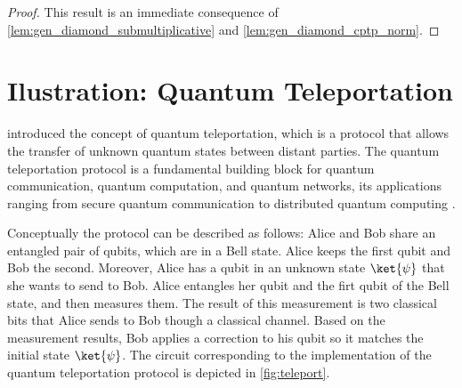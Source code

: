 \begin{proof}
  This result is an immediate consequence of \autoref{lem:gen_diamond_submultiplicative} and \autoref{lem:gen_diamond_cptp_norm}. 
\end{proof}


\section{Ilustration: Quantum Teleportation} \label{sec:teleport}

\cite{bennett1993teleporting} introduced the concept of quantum teleportation, which is a protocol that allows the transfer of   unknown quantum states between distant parties.  The quantum teleportation protocol is a fundamental building block for quantum communication, quantum computation, and quantum networks, its applications ranging
from secure quantum communication to distributed quantum computing \cite{briegel1998quantum,gottesman1999demonstrating,kimble2008quantum}. %

Conceptually the protocol can be described as follows: Alice and Bob share an entangled pair of qubits, which are in a Bell state. Alice keeps the first qubit and Bob the second. Moreover, Alice has a qubit in an unknown state $\ket{\psi}$ that she wants to send to Bob.  
 Alice entangles her qubit and the firt qubit of the Bell state, and then measures them. The result of this measurement is two classical bits that Alice sends to Bob though a classical channel. Based on the measurement results, Bob applies a correction to his qubit so it matches the initial state $\ket{\psi}$. 
The circuit corresponding to the implementation of the quantum teleportation protocol is depicted in \autoref{fig:teleport}. 

